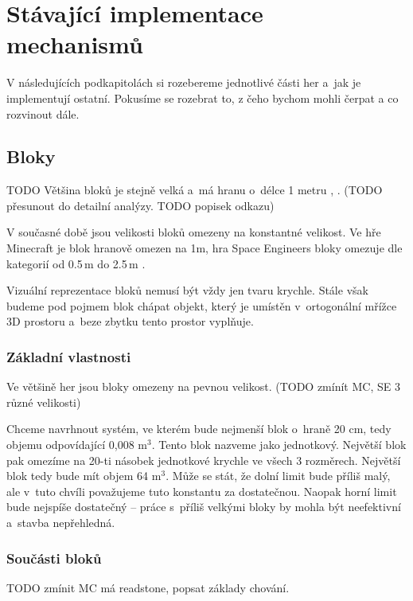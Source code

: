 

\section{Stávající implementace mechanismů}

V následujících podkapitolách si rozebereme jednotlivé části her a~jak je implementují ostatní. Pokusíme se rozebrat to, z čeho bychom mohli čerpat a co rozvinout dále.

\subsection{Bloky}


TODO  Většina bloků je stejně velká a~má hranu o~délce 1 metru \citep{mc_block}, \citep{mc_units}. (TODO přesunout do detailní analýzy. TODO popisek odkazu)


V současné době jsou velikosti bloků omezeny na konstantné velikost. Ve hře Minecraft je blok hranově omezen na 1m, hra Space Engineers bloky omezuje dle kategorií od 0.5\,\rm m do 2.5\,\rm m \citep{se_blocks_wiki}.


Vizuální reprezentace bloků nemusí být vždy jen tvaru krychle. Stále však budeme pod pojmem blok chápat objekt, který je umístěn v~ortogonální mřížce 3D prostoru a~beze zbytku tento prostor vyplňuje.






\subsubsection{Základní vlastnosti}
Ve většině her jsou bloky omezeny na pevnou velikost. (TODO zmínít MC, SE 3 různé velikosti)


Chceme navrhnout systém, ve kterém bude nejmenší blok o~hraně 20 cm, tedy objemu odpovídající 0,008 m$^3$. Tento blok nazveme jako jednotkový. Největší blok pak omezíme na 20-ti násobek jednotkové krychle ve všech 3 rozměrech. Největší blok tedy bude mít objem 64 m$^3$. Může se stát, že dolní limit bude příliš malý, ale v~tuto chvíli považujeme tuto konstantu za dostatečnou. Naopak horní limit bude nejspíše dostatečný -- práce s~příliš velkými bloky by mohla být neefektivní a~stavba nepřehledná.

\subsubsection{Součásti bloků}
TODO zmínit MC má readstone, popsat základy chování.



